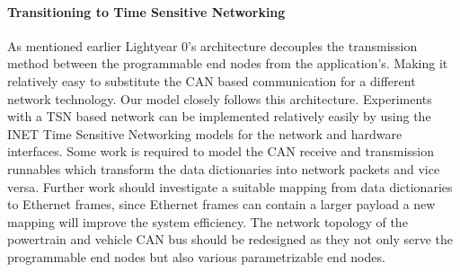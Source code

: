 \paragraph{Transitioning to Time Sensitive Networking}
As mentioned earlier Lightyear 0's architecture decouples the transmission method between the programmable end nodes from the application's. Making it relatively easy to substitute the CAN based communication for a different network technology. Our \omnet model closely follows this architecture. Experiments with a TSN based network can be implemented relatively easily by using the INET Time Sensitive Networking models for the network and hardware interfaces. Some work is required to model the CAN receive and transmission runnables which transform the data dictionaries into network packets and vice versa. Further work should investigate a suitable mapping from data dictionaries to Ethernet frames, since Ethernet frames can contain a larger payload a new mapping will improve the system efficiency. The network topology of the powertrain and vehicle CAN bus should be redesigned as they not only serve the programmable end nodes but also various parametrizable end nodes.